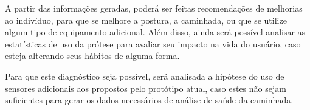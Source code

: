 A partir das informações geradas, poderá ser feitas recomendações de melhorias ao indivíduo, para que se melhore a postura, a caminhada, ou que se utilize algum tipo de equipamento adicional. Além disso, ainda será possível analisar as estatísticas de uso da prótese para avaliar seu impacto na vida do usuário, caso esteja alterando seus hábitos de alguma forma.

Para que este diagnóstico seja possível, será analisada a hipótese do uso de sensores adicionais aos propostos pelo protótipo atual, caso estes não sejam suficientes para gerar os dados necessários de análise de saúde da caminhada.